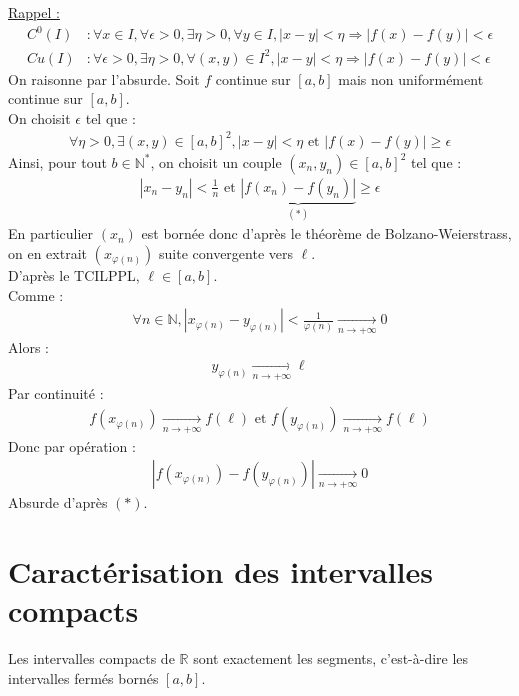 \documentclass[../main.tex]{subfiles}
\begin{document}
\noindent \underline{Rappel :}
\begin{align*}
    C^0(I) &: \forall x \in I, \forall \epsilon > 0, \exists \eta > 0, \forall y \in I, |x-y| < \eta \Rightarrow |f(x) - f(y)| < \epsilon \\
    Cu(I) &: \forall \epsilon > 0, \exists \eta > 0, \forall (x,y) \in I^2, |x-y| < \eta \Rightarrow |f(x) - f(y)| < \epsilon
\end{align*}
On raisonne par l'absurde. Soit $f$ continue sur $[a,b]$ mais non uniformément continue sur $[a,b]$. \\
On choisit $\epsilon$ tel que : 
\begin{align*}
    \forall \eta > 0, \exists (x, y) \in [a,b]^2, |x - y| < \eta \text{ et } |f(x) - f(y)| \geq \epsilon
\end{align*}
Ainsi, pour tout $b \in \mathbb{N}^*$, on choisit un couple $(x_n, y_n) \in [a,b]^2$ tel que : 
\begin{align*}
    |x_n - y_n| < \frac{1}{n} \text{ et } \underbrace{|f(x_n) - f(y_n)|}_{(*)} \geq \epsilon
\end{align*}
En particulier $(x_n)$ est bornée donc d'après le théorème de Bolzano-Weierstrass, on en extrait $(x_{\varphi(n)})$ suite convergente vers $\ell$. \\
D'après le TCILPPL, $\ell \in [a,b]$. \\
Comme : 
\begin{align*}
    \forall n \in \mathbb{N}, |x_{\varphi(n)} - y_{\varphi(n)}| < \frac{1}{\varphi(n)} \underset{n \to +\infty}{\longrightarrow} 0
\end{align*}
Alors : 
\begin{align*}
    y_{\varphi(n)} \underset{n \to +\infty}{\longrightarrow} \ell
\end{align*}
Par continuité : 
\begin{align*}
    f(x_{\varphi(n)}) \underset{n \to +\infty}{\longrightarrow} f(\ell) \text{ et } f(y_{\varphi(n)}) \underset{n \to +\infty}{\longrightarrow} f(\ell)
\end{align*}
Donc par opération : 
\begin{align*}
    |f(x_{\varphi(n)}) - f(y_{\varphi(n)})| \underset{n \to +\infty}{\longrightarrow} 0
\end{align*}
Absurde d'après $(*)$. 

\setcounter{section}{66}
\section{Caractérisation des intervalles compacts}
\begin{tcolorbox}[title=Lemme 15.67, title filled=false, colframe=orange, colback=orange!10!white]
    Les intervalles compacts de $\mathbb{R}$ sont exactement les segments, c'est-à-dire les intervalles fermés bornés $[a,b]$. 
\end{tcolorbox}
\end{document}
